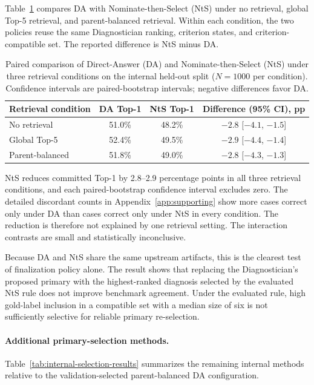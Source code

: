 Table~\ref{tab:nts-factorial} compares DA with Nominate-then-Select (NtS) under no retrieval, global Top-5 retrieval, and parent-balanced retrieval. Within each condition, the two policies reuse the same Diagnostician ranking, criterion states, and criterion-compatible set. The reported difference is NtS minus DA.

\begin{table}[htbp]
\centering
\caption{Paired comparison of Direct-Answer (DA) and Nominate-then-Select (NtS) under three retrieval conditions on the internal held-out split ($N=1000$ per condition). Confidence intervals are paired-bootstrap intervals; negative differences favor DA.}
\label{tab:nts-factorial}
\small
\begin{tabular}{|l|c|c|c|}
\hline
Retrieval condition & DA Top-1 & NtS Top-1 & Difference (95\% CI), pp\\
\hline
No retrieval & 51.0\% & 48.2\% & $-2.8$ [$-4.1$, $-1.5$]\\
\hline
Global Top-5 & 52.4\% & 49.5\% & $-2.9$ [$-4.4$, $-1.4$]\\
\hline
Parent-balanced & 51.8\% & 49.0\% & $-2.8$ [$-4.3$, $-1.3$]\\
\hline
\end{tabular}
\end{table}

NtS reduces committed Top-1 by 2.8--2.9 percentage points in all three retrieval conditions, and each paired-bootstrap confidence interval excludes zero. The detailed discordant counts in Appendix~\ref{app:supporting} show more cases correct only under DA than cases correct only under NtS in every condition. The reduction is therefore not explained by one retrieval setting. The interaction contrasts are small and statistically inconclusive.

Because DA and NtS share the same upstream artifacts, this is the clearest test of finalization policy alone. The result shows that replacing the Diagnostician's proposed primary with the highest-ranked diagnosis selected by the evaluated NtS rule does not improve benchmark agreement. Under the evaluated rule, high gold-label inclusion in a compatible set with a median size of six is not sufficiently selective for reliable primary re-selection.

\paragraph{Additional primary-selection methods.}
Table~\ref{tab:internal-selection-results} summarizes the remaining internal methods relative to the validation-selected parent-balanced DA configuration.

